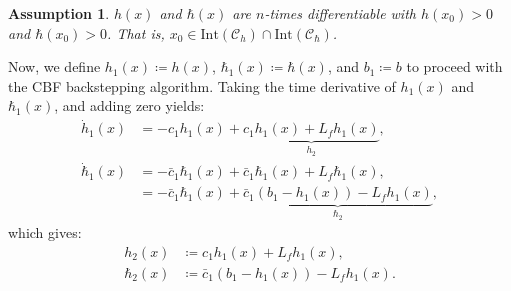 \documentclass[letterpaper, 10 pt, conference]{ieeeconf}
\newtheorem{assumption}{Assumption}
\begin{document}
\begin{assumption}\label{assum_backstepping}
    $h(x)$ and $\hbar(x)$ are $n$-times differentiable with  $h(x_0)>0$ and $\hbar(x_0)>0$. That is, $x_0 \in \text{Int}(\mathcal{C}_h)\cap\text{Int}(\mathcal{C}_{\hbar})$.
\end{assumption}




Now, we define $h_1(x) \coloneqq h(x)$, $\hbar_1(x) \coloneqq \hbar(x)$, and $b_1 \coloneqq b$ to proceed with the CBF backstepping algorithm. Taking the time derivative of $h_1(x)$ and $\hbar_1(x)$, and adding zero yields:
\begin{align}
    \dot{h}_1 (x) &= -c_1 h_1(x) + \underbrace{c_1 h_1(x) + L_fh_1(x)}_{h_2},\\
    \dot{\hbar}_1 (x) &= -\bar{c}_1 \hbar_1(x) + \bar{c}_1 \hbar_1(x) + L_f\hbar_1(x),\\
    &= -\bar{c}_1 \hbar_1(x)  + \underbrace{\bar{c}_1 (b_1-h_1(x)) - L_fh_1(x)}_{\hbar_2},
\end{align}
which gives:
\begin{align}
    h_2(x) &\coloneqq c_1 h_1(x) + L_fh_1(x),\\
    \hbar_2(x) &\coloneqq \bar{c}_1 (b_1-h_1(x)) - L_fh_1(x)\label{hbar_2}.
\end{align}
\end{document}
